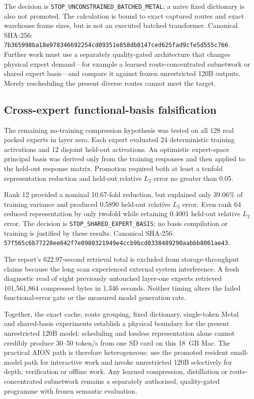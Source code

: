 The decision is \texttt{STOP\_UNCONSTRAINED\_BATCHED\_METAL}; a naive
fixed dictionary is also not promoted.  The calculation is bound to exact
captured routes and exact warehouse frame sizes, but is not an executed
batched transformer.  Canonical SHA-256:
\texttt{7b365998ba18e978346692254cd09351e858db0147ced625fad9cfe5d555c766}.
Further work must use a separately quality-gated architecture that changes
physical expert demand---for example a learned route-concentrated subnetwork
or shared expert basis---and compare it against frozen unrestricted 120B
outputs.  Merely rescheduling the present diverse routes cannot meet the
target.

\subsection{Cross-expert functional-basis falsification}
The remaining no-training compression hypothesis was tested on all 128 real
packed experts in layer zero. Each expert evaluated 24 deterministic training
activations and 12 disjoint held-out activations. An optimistic expert-space
principal basis was derived only from the training responses and then applied
to the held-out response matrix. Promotion required both at least a tenfold
representation reduction and held-out relative $L_2$ error no greater than
0.05.

Rank 12 provided a nominal 10.67-fold reduction, but explained only 39.06\% of
training variance and produced 0.5890 held-out relative $L_2$ error. Even rank
64 reduced representation by only twofold while retaining 0.4001 held-out
relative $L_2$ error. The decision is
\texttt{STOP\_SHARED\_EXPERT\_BASIS}; no basis compilation or training is
justified by these results. Canonical SHA-256:
\texttt{57f565c6b77228ee642f7e0980321949e4ccb9bcd0338489290aabbb8061ae43}.

The report's 622.97-second retrieval total is excluded from storage-throughput
claims because the long scan experienced external system interference. A
fresh diagnostic read of eight previously untouched layer-one experts
retrieved 101,561,864 compressed bytes in 1.346 seconds. Neither timing alters
the failed functional-error gate or the measured model generation rate.

Together, the exact cache, route grouping, fixed dictionary, single-token
Metal and shared-basis experiments establish a physical boundary for the
present unrestricted 120B model: scheduling and lossless representation alone
cannot credibly produce 30--50 token/s from one SD card on this 18~GB Mac. The
practical AION path is therefore heterogeneous: use the promoted resident
small-model path for interactive work and invoke unrestricted 120B selectively
for depth, verification or offline work. Any learned compression, distillation
or route-concentrated subnetwork remains a separately authorised,
quality-gated programme with frozen semantic evaluation.

